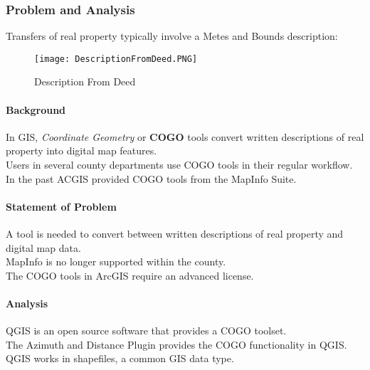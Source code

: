 \subsubsection{Problem and Analysis}
Transfers of real property typically involve a Metes and Bounds description:
\begin{figure}[h!]
\centering
    \texttt{[image: DescriptionFromDeed.PNG]}
\vspace{-.2in}

\caption{Description From Deed}
\end{figure}
\begin{adjmulticols}{2}{\innerMar}{\outerMar}
\paragraph{Background}
In GIS, \textit{Coordinate Geometry} or \textbf{COGO} tools convert written descriptions of real property into digital map features.\\

\noindent Users in several county departments use COGO tools in their regular workflow.\\

\noindent In the past ACGIS provided COGO tools from the MapInfo Suite.

\paragraph{Statement of Problem}
A tool is needed to convert between written descriptions of real property and digital map data.\\

\noindent MapInfo is no longer supported within the county.\\

\noindent The COGO tools in ArcGIS require an advanced license.
\paragraph{Analysis}
QGIS is an open source software that provides a COGO toolset.\\

\noindent The Azimuth and Distance Plugin provides the COGO functionality in QGIS.\\

\noindent QGIS works in shapefiles, a common GIS data type.\\

\end{adjmulticols}
\vspace{1in}

